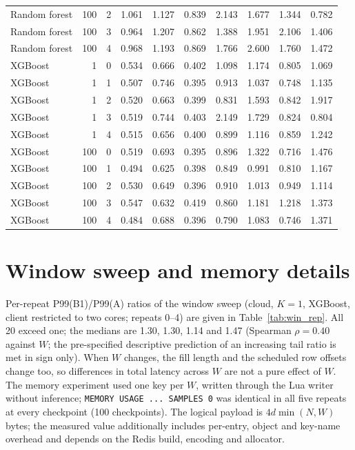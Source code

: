 \documentclass[10pt,a4paper]{article}
\begin{document}
\begin{longtable}{lrrrrrrrrr}
Random forest & 100 & 2 & 1.061 & 1.127 & 0.839 & 2.143 & 1.677 & 1.344 & 0.782 \\
Random forest & 100 & 3 & 0.964 & 1.207 & 0.862 & 1.388 & 1.951 & 2.106 & 1.406 \\
Random forest & 100 & 4 & 0.968 & 1.193 & 0.869 & 1.766 & 2.600 & 1.760 & 1.472 \\
XGBoost & 1 & 0 & 0.534 & 0.666 & 0.402 & 1.098 & 1.174 & 0.805 & 1.069 \\
XGBoost & 1 & 1 & 0.507 & 0.746 & 0.395 & 0.913 & 1.037 & 0.748 & 1.135 \\
XGBoost & 1 & 2 & 0.520 & 0.663 & 0.399 & 0.831 & 1.593 & 0.842 & 1.917 \\
XGBoost & 1 & 3 & 0.519 & 0.744 & 0.403 & 2.149 & 1.729 & 0.824 & 0.804 \\
XGBoost & 1 & 4 & 0.515 & 0.656 & 0.400 & 0.899 & 1.116 & 0.859 & 1.242 \\
XGBoost & 100 & 0 & 0.519 & 0.693 & 0.395 & 0.896 & 1.322 & 0.716 & 1.476 \\
XGBoost & 100 & 1 & 0.494 & 0.625 & 0.398 & 0.849 & 0.991 & 0.810 & 1.167 \\
XGBoost & 100 & 2 & 0.530 & 0.649 & 0.396 & 0.910 & 1.013 & 0.949 & 1.114 \\
XGBoost & 100 & 3 & 0.547 & 0.632 & 0.419 & 0.860 & 1.181 & 1.218 & 1.373 \\
XGBoost & 100 & 4 & 0.484 & 0.688 & 0.396 & 0.790 & 1.083 & 0.746 & 1.371 \\
\bottomrule
\end{longtable}

\section{Window sweep and memory details}
\label{sec:window}
Per-repeat P99(B1)/P99(A) ratios of the window sweep (cloud, $K=1$, XGBoost, client restricted to two cores; repeats 0--4) are given in Table~\ref{tab:win_rep}. All 20 exceed one; the medians are 1.30, 1.30, 1.14 and 1.47 (Spearman $\rho=0.40$ against $W$; the pre-specified descriptive prediction of an increasing tail ratio is met in sign only). When $W$ changes, the fill length and the scheduled row offsets change too, so differences in total latency across $W$ are not a pure effect of $W$. The memory experiment used one key per $W$, written through the Lua writer without inference; \texttt{MEMORY USAGE ... SAMPLES 0} was identical in all five repeats at every checkpoint (100 checkpoints). The logical payload is $4d\min(N,W)$ bytes; the measured value additionally includes per-entry, object and key-name overhead and depends on the Redis build, encoding and allocator.
\end{document}

